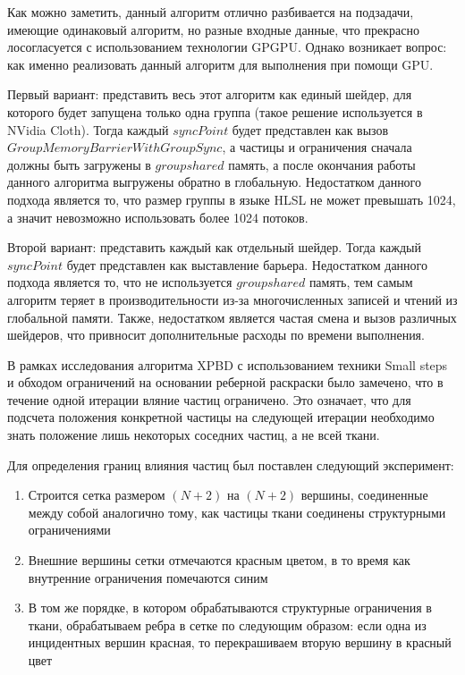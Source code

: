 	Как можно заметить, данный алгоритм отлично разбивается на подзадачи, имеющие одинаковый алгоритм, но разные входные данные, что прекрасно лосогласуется с использованием технологии GPGPU. Однако возникает вопрос: как именно реализовать данный алгоритм для выполнения при помощи GPU.
	
	Первый вариант: представить весь этот алгоритм как единый шейдер, для которого будет запущена только одна группа (такое решение используется в NVidia Cloth). Тогда каждый $syncPoint$ будет представлен как вызов $GroupMemoryBarrierWithGroupSync$, а частицы и ограничения сначала должны быть загружены в $groupshared$ память, а после окончания работы данного алгоритма выгружены обратно в глобальную. Недостатком данного подхода является то, что размер группы в языке HLSL не может превышать 1024, а значит невозможно использовать более 1024 потоков.
	
	Второй вариант: представить каждый  как отдельный шейдер. Тогда каждый $syncPoint$ будет представлен как выставление барьера. Недостатком данного подхода является то, что не используется $groupshared$ память, тем самым алгоритм теряет в производительности из-за многочисленных записей и чтений из глобальной памяти. Также, недостатком является частая смена и вызов различных шейдеров, что привносит дополнительные расходы по времени выполнения.
	
	В рамках исследования алгоритма XPBD с использованием техники Small steps и обходом ограничений на основании реберной раскраски было замечено, что в течение одной итерации вляние частиц ограничено. Это означает, что для подсчета положения конкретной частицы на следующей итерации необходимо знать положение лишь некоторых соседних частиц, а не всей ткани.
	
	Для определения границ влияния частиц был поставлен следующий эксперимент:
	\begin{enumerate}[1.]
		\item Строится сетка размером $(N+2)$ на $(N+2)$ вершины, соединенные между собой аналогично тому, как частицы ткани соединены структурными ограничениями
		\item Внешние вершины сетки отмечаются красным цветом, в то время как внутренние ограничения помечаются синим
		\item В том же порядке, в котором обрабатываются структурные ограничения в ткани, обрабатываем ребра в сетке по следующим образом: если одна из инцидентных вершин красная, то перекрашиваем вторую вершину в красный цвет
	\end{enumerate}
	
